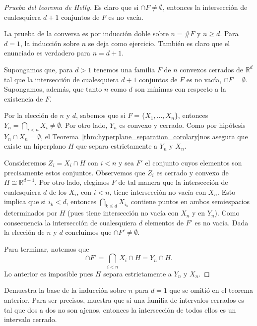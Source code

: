 \documentclass{standalone}
\begin{document}
	\begin{proof}[Prueba del teorema de Helly]
		Es claro que si $\cap F\neq \emptyset$, entonces la intersección de cualesquiera $d+1$ conjuntos de $F$ es no vacía.
		
		La prueba de la conversa es por inducción doble sobre $n=\#F$ y $n\geq d$. Para $d=1$, la inducción sobre $n$ se deja como ejercicio. También es claro que el enunciado es verdadero para $n=d+1$.
		
		Supongamos que, para $d>1$ tenemos una familia $F$ de $n$ convexos cerrados de $\mathbb{R}^{d}$ tal que la intersección de cualesquiera $d+1$ conjuntos de $F$ es no vacía, $\cap F=\emptyset$. Supongamos, además, que tanto $n$ como $d$ son mínimas con respecto a la existencia de $F$.
		
		Por la elección de $n$ y $d$, sabemos que si $F=\{X_{1},\dots, X_{n}\}$, entonces $Y_{n}=\bigcap_{i<n}X_{i}\neq\emptyset$. Por otro lado, $Y_{n}$ es convexo y cerrado. Como por hipótesis $Y_{n}\cap X_{n}=\emptyset$, el Teorema~\ref{thm:hyperplane_separation_corolary}nos asegura que existe un hiperplano $H$ que separa estrictamente a $Y_{n}$ y $X_{n}$.
		
		Consideremos $Z_{i}= X_{i}\cap H$ con $i<n$ y sea $F'$ el conjunto cuyos elementos son precisamente estos conjuntos. Observemos que $Z_{i}$ es cerrado y convexo de $H\cong\mathbb{R}^{d-1}$. Por otro lado, elegimos $F$ de tal manera que la intersección de cualesquiera $d$ de los $X_{i}$, con $i<n$, tiene intersección no vacía con $X_{n}$. Esto implica que si $i_{k}<d$, entonces $\bigcap_{k\leq d}X_{i_{k}}$ contiene puntos en ambos semiespacios determinados por $H$ (pues tiene intersección no vacía con $X_{n}$ y en $Y_{n}$). Como consecuencia la intersección de cualesquiera $d$ elementos de $F'$ es no vacía. Dada la elección de $n$ y $d$ concluimos que $\cap F'\neq\emptyset$.
		
		Para terminar, notemos que 
		\[
		\cap F' = \bigcap_{i<n}X_{i}\cap H =Y_{n}\cap H.
		\]
		Lo anterior es imposible pues $H$ separa estrictamente a $Y_{n}$ y $X_{n}$.
	\end{proof}
	
	\begin{exercise}
		Demuestra la base de la inducción sobre $n$ para $d=1$ que se omitió en el teorema anterior. Para ser precisos, muestra que si una familia de intervalos cerrados es tal que dos a dos no son ajenos, entonces la intersección de todos ellos es un intervalo cerrado.
	\end{exercise}
	
\end{document}
